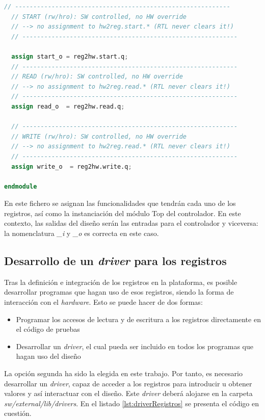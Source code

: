 \begin{lstlisting}[language=verilog,frame=single,caption={Código fuente del testbench},showstringspaces=false,label=lst:wrapperControladorRegistros]
  // -----------------------------------------------------------
  // START (rw/hro): SW controlled, no HW override
  // --> no assignment to hw2reg.start.* (RTL never clears it!)
  // -----------------------------------------------------------
  
  assign start_o = reg2hw.start.q;
  // -----------------------------------------------------------
  // READ (rw/hro): SW controlled, no HW override
  // --> no assignment to hw2reg.read.* (RTL never clears it!)
  // -----------------------------------------------------------
  assign read_o  = reg2hw.read.q;
  
  // -----------------------------------------------------------
  // WRITE (rw/hro): SW controlled, no HW override
  // --> no assignment to hw2reg.read.* (RTL never clears it!)
  // -----------------------------------------------------------
  assign write_o  = reg2hw.write.q;

endmodule
\end{lstlisting}

En este fichero se asignan las funcionalidades que tendrán cada uno de los registros, así como la instanciación del módulo Top del controlador. En este contexto, las salidas del diseño serán las entradas para el controlador y viceversa: la nomenclatura \emph{\_i} y \emph{\_o} es correcta en este caso.

\subsection{Desarrollo de un \emph{driver} para los registros}
Tras la definición e integración de los registros en la plataforma, es posible desarrollar programas que hagan uso de esos registros, siendo la forma de interacción con el \textit{hardware}. Esto se puede hacer de dos formas:

\begin{itemize}
    \item Programar los accesos de lectura y de escritura a los registros directamente en el código de pruebas
    \item Desarrollar un \textit{driver}, el cual pueda ser incluido en todos los programas que hagan uso del diseño
\end{itemize}

La opción segunda ha sido la elegida en este trabajo. Por tanto, es necesario desarrollar un \emph{driver}, capaz de acceder a los registros para introducir u obtener valores y así interactuar con el diseño. Este \emph{driver} deberá alojarse en la carpeta \emph{sw/external/lib/drivers}. En el listado \ref{lst:driverRegistros} se presenta el código en cuestión.

